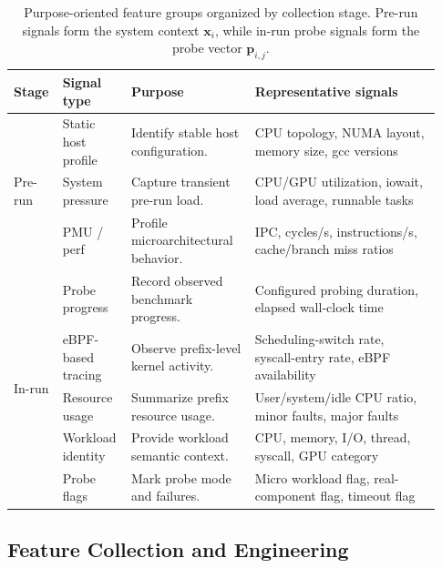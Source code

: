 \documentclass[sigplan,10pt]{acmart}
\begin{document}
\begin{table}[t]
\centering
\caption{Purpose-oriented feature groups organized by collection stage. Pre-run signals form the system context \(\mathbf{x}_i\), while in-run probe signals form the probe vector \(\mathbf{p}_{i,j}\).}
\label{tab:feature_collection}
\small
\setlength{\tabcolsep}{5pt}
\renewcommand{\arraystretch}{1.10}
\begin{tabular}{p{0.07\linewidth}| p{0.15\linewidth} p{0.29\linewidth} p{0.42\linewidth}}
\toprule
\textbf{Stage} & \textbf{Signal type} & \textbf{Purpose} & \textbf{Representative signals} \\
\midrule

\multirow{3}{=}{Pre-run}
& Static host profile
& Identify stable host configuration.
& CPU topology, NUMA layout, memory size, gcc versions \\

& System pressure
& Capture transient pre-run load.
& CPU/GPU utilization, iowait, load average, runnable tasks \\

& PMU / perf
& Profile microarchitectural behavior.
& IPC, cycles/s, instructions/s, cache/branch miss ratios \\

\midrule

\multirow{5}{=}{In-run}
& Probe progress
& Record observed benchmark progress.
& Configured probing duration, elapsed wall-clock time \\

& eBPF-based tracing
& Observe prefix-level kernel activity.
& Scheduling-switch rate, syscall-entry rate, eBPF availability \\

& Resource usage
& Summarize prefix resource usage.
& User/system/idle CPU ratio, minor faults, major faults \\

& Workload identity
& Provide workload semantic context.
& CPU, memory, I/O, thread, syscall, GPU category \\

& Probe flags
& Mark probe mode and failures.
& Micro workload flag, real-component flag, timeout flag \\

\bottomrule
\end{tabular}
\end{table}

\subsection{Feature Collection and Engineering}
\label{subsec:feature-collection}
\end{document}

